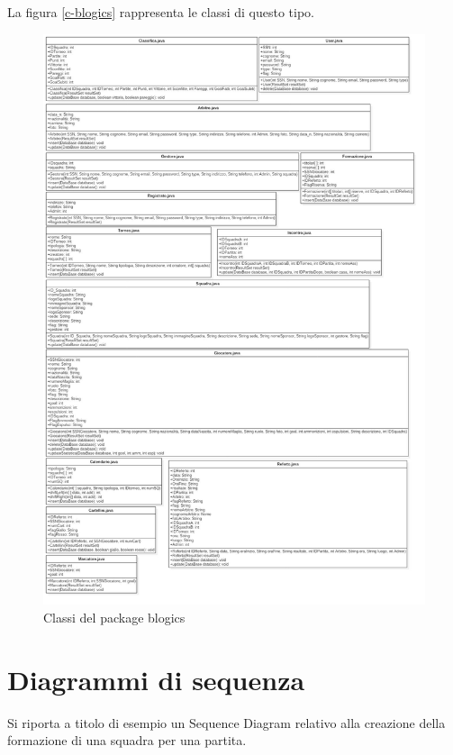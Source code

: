 	La figura \vref{c-blogics} rappresenta le classi di questo tipo.
	
	\begin{figure}[h]
		\centering
		\includegraphics[width=1\textwidth]
		{immagini/c-blogics}
		
		\caption{Classi del package blogics}
		\label{c-blogics}
	\end{figure}

\clearpage

\section{Diagrammi di sequenza}
Si riporta a titolo di esempio un Sequence Diagram relativo alla creazione della formazione di una squadra per una partita.

